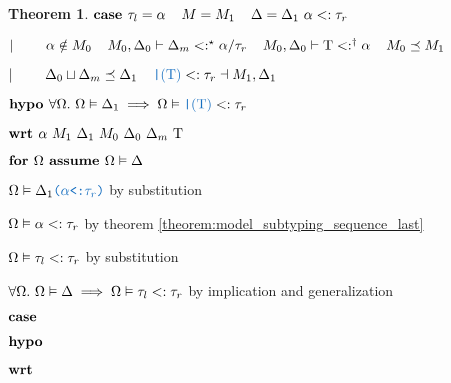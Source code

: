 \documentclass[acmsmall]{acmart}
\theoremstyle{definition}
\newtheorem{theorem}{Theorem}[section]
\begin{document}
\begin{theorem}
    \item \Z $\textbf{case } 
      \tau_l = \alpha
      \hspace{4mm}
      M = M_1
      \hspace{4mm}
      \Delta = \Delta_1\ \alpha <: \tau_r
    $
    \item \Z $|\ \ \ \ \ \ \ 
      \alpha \notin M_0
      \hspace{4mm}
      M_0, \Delta_0 \vdash \Delta_m <:^\star \alpha \slash \tau_r
      \hspace{4mm}
      M_0, \Delta_0 \vdash \mathrm{T} <:^\dagger \alpha
      \hspace{4mm}
      M_0 \preceq M_1
    $
    \item \Z $\contin
      \Delta_0 \sqcup \Delta_m \preceq \Delta_1
      \I
      \obj{|$(\Tau)$} <: \tau_r \given M_1, \Delta_1
    $
    \item \Z $\B{hypo } \forall \Omega .\ \Omega \satisfies \Delta_1 \implies
      \Omega \satisfies \obj{|$(\Tau)$} <: \tau_r
    $
    \item \Z $\B{wrt } \alpha\ M_1\ \Delta_1\ M_0\ \Delta_0\ \Delta_m\ \Tau$
      \item \Z\Z $\textbf{for } \Omega \textbf{ assume } \Omega \vDash \Delta$
        \item \Z\Z\Z $\Omega \satisfies \Delta_1 \obj{($\alpha$<:$\tau_r$)}$ by substitution
        \item \Z\Z\Z $\Omega \vDash \alpha <: \tau_r$ by theorem \ref{theorem:model_subtyping_sequence_last} 
        \item \Z\Z\Z $\Omega \vDash \tau_l <: \tau_r$ by substitution 
      \item \Z\Z $\forall \Omega .\ \Omega \vDash \Delta \implies \Omega \vDash \tau_l <: \tau_r$ 
      by implication and generalization 
      \item \Z\Z {} 

    \item \Z $\textbf{case } $
    \item \Z $\textbf{hypo } $
    \item \Z $\textbf{wrt } $
      \item \Z\Z {} 


\end{theorem}
\end{document}

